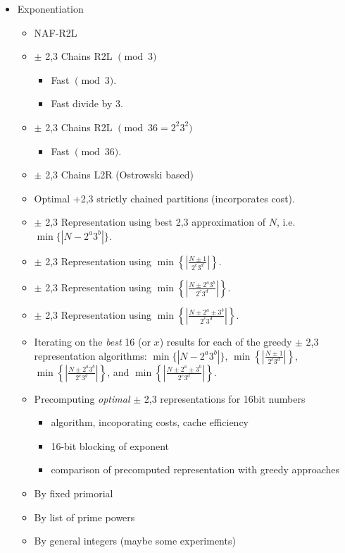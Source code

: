 \documentclass[11pt, letterpaper]{article}
\theoremstyle{definition}
\begin{document}
\begin{itemize}
\item Exponentiation
	\begin{itemize}
	\item NAF-R2L
	\item $\pm$ 2,3 Chains R2L $\pmod{3}$
		\begin{itemize}
		\item Fast $\pmod 3$.
		\item Fast divide by 3.
		\end{itemize}
	\item $\pm$ 2,3 Chains R2L $\pmod{36=2^2 3^2}$
		\begin{itemize}
		\item Fast $\pmod{36}$.
		\end{itemize}
	\item $\pm$ 2,3 Chains L2R (Ostrowski based)
	\item Optimal +2,3 strictly chained partitions (incorporates cost).
	\item $\pm$ 2,3 Representation using best 2,3 approximation of $N$, i.e. $\min \{|N-2^a3^b|\}$.
	\item $\pm$ 2,3 Representation using $\min \left\{ \left| \frac{N \pm 1}{2^c3^d} \right| \right\}$.
	\item $\pm$ 2,3 Representation using $\min \left\{ \left| \frac{N \pm 2^a3^b}{2^c3^d} \right| \right\}$.
	\item $\pm$ 2,3 Representation using $\min \left\{ \left| \frac{N \pm 2^a \pm 3^b}{2^c3^d} \right| \right\}$.
	\item Iterating on the \emph{best} 16 (or $x$) results for each of the greedy $\pm$ 2,3 representation algorithms: $\min \{|N-2^a3^b|\}$, $\min \left\{ \left| \frac{N \pm 1}{2^c3^d} \right| \right\}$, $\min \left\{ \left| \frac{N \pm 2^a3^b}{2^c3^d} \right| \right\}$, and $\min \left\{ \left| \frac{N \pm 2^a \pm 3^b}{2^c3^d} \right| \right\}$.
	\item Precomputing \emph{optimal} $\pm$ 2,3 representations for 16bit numbers
		\begin{itemize}
		\item algorithm, incoporating costs, cache efficiency
		\item 16-bit blocking of exponent
		\item comparison of precomputed representation with greedy approaches
		\end{itemize}
	
	\item By fixed primorial
	\item By list of prime powers
	\item By general integers (maybe some experiments)
	\end{itemize}


\end{itemize}
\end{document}
